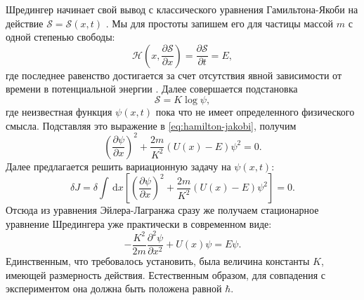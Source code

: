 \documentclass[14pt, a4paper]{extreport}
\newcommand{\diff}{\,\mathrm{d}}
\numberwithin{equation}{section}
\begin{document}
Шредингер начинает свой вывод с классического уравнения Гамильтона-Якоби на действие $\mathcal{S} = \mathcal S (x,t)$ \cite{schrodinger2003collected}. Мы для простоты запишем его для частицы массой $m$ с одной степенью свободы:
\begin{equation}
	\mathcal{H}\left(x, \frac{\partial \mathcal S}{\partial x}\right) = \frac{\partial \mathcal S}{\partial t} = E, \label{eq:hamilton-jakobi}
\end{equation}
где последнее равенство достигается за счет отсутствия явной зависимости от времени в потенциальной энергии \cite{shmutzer1976}. Далее совершается подстановка
\begin{equation}
	\mathcal S = K \log \psi, \label{eq:psi_action}
\end{equation}
где неизвестная функция $\psi(x,t)$ пока что не имеет определенного физического смысла. Подставляя это выражение в \eqref{eq:hamilton-jakobi}, получим
\begin{equation}
	\left(\frac{\partial \psi}{\partial x} \right)^2 + \frac{2m}{K^2}(U(x) - E)\psi^2 = 0.
\end{equation}
Далее предлагается решить вариационную задачу на $\psi(x, t)$:
\begin{equation}
	\delta J = \delta \int \diff x \left[ \left(\frac{\partial \psi}{\partial x} \right)^2 +  \frac{2m}{K^2}(U(x) - E)\psi^2 \right] = 0.
\end{equation}
Отсюда из уравнения Эйлера-Лагранжа \cite{hilbertcourant} сразу же получаем стационарное уравнение Шредингера уже практически в современном виде:
\begin{equation}
	-\frac{K^2}{2m}\frac{\partial^2 \psi}{\partial x^2} + U(x)\psi = E \psi.\label{eq:shroedinger_stationary}
\end{equation}
Единственным, что требовалось установить, была величина константы $K$, имеющей размерность действия. Естественным образом, для совпадения с экспериментом она должна быть положена равной $\hbar$.
\end{document}
